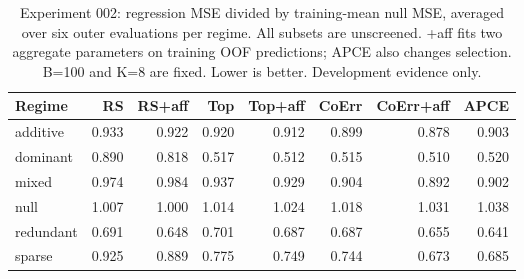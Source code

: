 \begin{table}[t]
\centering\small
\begin{tabular}{lrrrrrrr}
\toprule
Regime & RS & RS+aff & Top & Top+aff & CoErr & CoErr+aff & APCE \\
\midrule
additive & 0.933 & 0.922 & 0.920 & 0.912 & 0.899 & 0.878 & 0.903 \\
dominant & 0.890 & 0.818 & 0.517 & 0.512 & 0.515 & 0.510 & 0.520 \\
mixed & 0.974 & 0.984 & 0.937 & 0.929 & 0.904 & 0.892 & 0.902 \\
null & 1.007 & 1.000 & 1.014 & 1.024 & 1.018 & 1.031 & 1.038 \\
redundant & 0.691 & 0.648 & 0.701 & 0.687 & 0.687 & 0.655 & 0.641 \\
sparse & 0.925 & 0.889 & 0.775 & 0.749 & 0.744 & 0.673 & 0.685 \\
\bottomrule
\end{tabular}
\caption{Experiment 002: regression MSE divided by training-mean null MSE, averaged over six outer evaluations per regime. All subsets are unscreened. +aff fits two aggregate parameters on training OOF predictions; APCE also changes selection. B=100 and K=8 are fixed. Lower is better. Development evidence only.}
\end{table}
